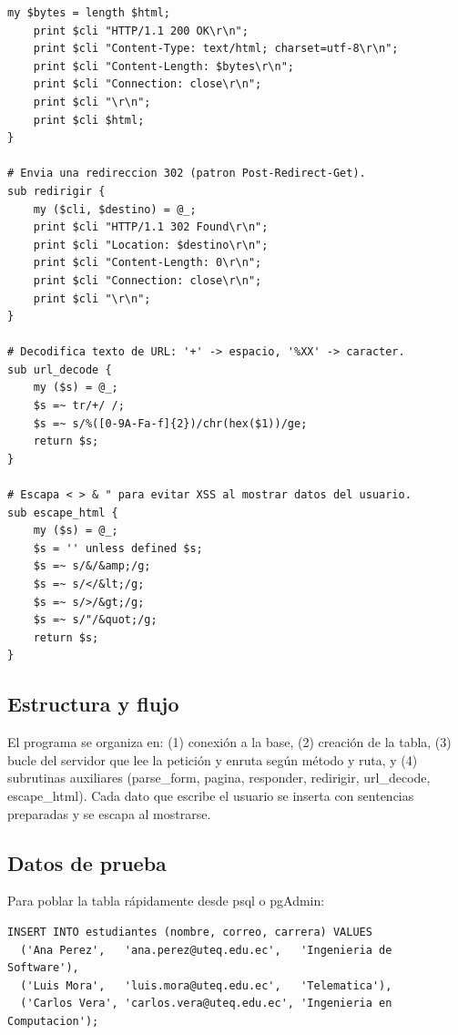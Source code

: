 \documentclass[11pt]{article}
\begin{document}
\vspace{2pt}
\begin{cajacodigo}
\begin{lstlisting}[style=perl]
    my $bytes = length $html;
    print $cli "HTTP/1.1 200 OK\r\n";
    print $cli "Content-Type: text/html; charset=utf-8\r\n";
    print $cli "Content-Length: $bytes\r\n";
    print $cli "Connection: close\r\n";
    print $cli "\r\n";
    print $cli $html;
}

# Envia una redireccion 302 (patron Post-Redirect-Get).
sub redirigir {
    my ($cli, $destino) = @_;
    print $cli "HTTP/1.1 302 Found\r\n";
    print $cli "Location: $destino\r\n";
    print $cli "Content-Length: 0\r\n";
    print $cli "Connection: close\r\n";
    print $cli "\r\n";
}

# Decodifica texto de URL: '+' -> espacio, '%XX' -> caracter.
sub url_decode {
    my ($s) = @_;
    $s =~ tr/+/ /;
    $s =~ s/%([0-9A-Fa-f]{2})/chr(hex($1))/ge;
    return $s;
}

# Escapa < > & " para evitar XSS al mostrar datos del usuario.
sub escape_html {
    my ($s) = @_;
    $s = '' unless defined $s;
    $s =~ s/&/&amp;/g;
    $s =~ s/</&lt;/g;
    $s =~ s/>/&gt;/g;
    $s =~ s/"/&quot;/g;
    return $s;
}
\end{lstlisting}
\end{cajacodigo}
\vspace{2pt}
\subsection{Estructura y flujo}
El programa se organiza en: (1) conexión a la base, (2) creación de la tabla, (3) bucle del servidor que lee la petición y enruta según método y ruta, y (4) subrutinas auxiliares (parse\_form, pagina, responder, redirigir, url\_decode, escape\_html). Cada dato que escribe el usuario se inserta con sentencias preparadas y se escapa al mostrarse.

\subsection{Datos de prueba}
Para poblar la tabla rápidamente desde psql o pgAdmin:

\begin{cajacodigo}
\begin{lstlisting}[style=sql]
INSERT INTO estudiantes (nombre, correo, carrera) VALUES
  ('Ana Perez',   'ana.perez@uteq.edu.ec',   'Ingenieria de Software'),
  ('Luis Mora',   'luis.mora@uteq.edu.ec',   'Telematica'),
  ('Carlos Vera', 'carlos.vera@uteq.edu.ec', 'Ingenieria en Computacion');
\end{lstlisting}
\end{cajacodigo}
\vspace{2pt}
\end{document}
